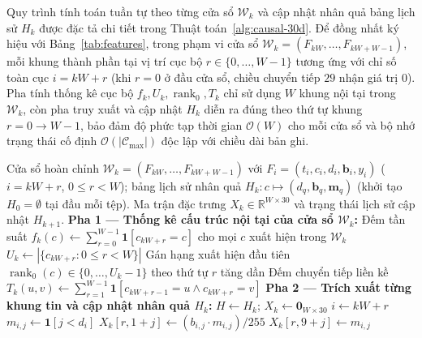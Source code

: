 \documentclass[12pt, a4paper, reqno, oneside]{book}
\begin{document}
Quy trình tính toán tuần tự theo từng cửa sổ $\mathcal{W}_k$ và cập nhật nhân quả bảng lịch sử $H_k$ được đặc tả chi tiết trong Thuật toán~\ref{alg:causal-30d}. Để đồng nhất ký hiệu với Bảng~\ref{tab:features}, trong phạm vi cửa sổ $\mathcal{W}_k=(F_{kW},\ldots,F_{kW+W-1})$, mỗi khung thành phần tại vị trí cục bộ $r \in \{0,\ldots,W-1\}$ tương ứng với chỉ số toàn cục $i = kW + r$ (khi $r=0$ ở đầu cửa sổ, chiều chuyển tiếp $29$ nhận giá trị $0$). Pha tính thống kê cục bộ $f_k, U_k, \operatorname{rank}_0, T_k$ chỉ sử dụng $W$ khung nội tại trong $\mathcal{W}_k$, còn pha truy xuất và cập nhật $H_k$ diễn ra đúng theo thứ tự khung $r=0 \to W-1$, bảo đảm độ phức tạp thời gian $\mathcal{O}(W)$ cho mỗi cửa sổ và bộ nhớ trạng thái cố định $\mathcal{O}(|\mathcal{C}_{\max}|)$ độc lập với chiều dài bản ghi.

\begin{algorithm}[htbp]
\caption{Trích xuất nhân quả biểu diễn cấu trúc 30 chiều cấp cửa sổ $\Phi(\mathcal{W}_k; H_k)$}\label{alg:causal-30d}
{\small\linespread{1.05}\selectfont
\begin{algorithmic}[1]
\Require Cửa sổ hoàn chỉnh $\mathcal{W}_k = (F_{kW}, \ldots, F_{kW+W-1})$ với $F_i = (t_i, c_i, d_i, \mathbf{b}_i, y_i)$ ($i = kW+r$, $0 \le r < W$); bảng lịch sử nhân quả $H_k : c \mapsto (d_q, \mathbf{b}_q, \mathbf{m}_q)$ (khởi tạo $H_0 = \emptyset$ tại đầu mỗi tệp).
\Ensure Ma trận đặc trưng $X_k \in \mathbb{R}^{W \times 30}$ và trạng thái lịch sử cập nhật $H_{k+1}$.
\State \textbf{Pha 1 --- Thống kê cấu trúc nội tại của cửa sổ $\mathcal{W}_k$:}
\State Đếm tần suất $f_k(c) \leftarrow \sum_{r=0}^{W-1} \mathbf{1}[c_{kW+r} = c]$ cho mọi $c$ xuất hiện trong $\mathcal{W}_k$
\State $U_k \leftarrow |\{c_{kW+r} : 0 \le r < W\}|$ 
\State Gán hạng xuất hiện đầu tiên $\operatorname{rank}_0(c) \in \{0, \ldots, U_k - 1\}$ theo thứ tự $r$ tăng dần
\State Đếm chuyển tiếp liền kề $T_k(u, v) \leftarrow \sum_{r=1}^{W-1} \mathbf{1}[c_{kW+r-1} = u \land c_{kW+r} = v]$
\State \textbf{Pha 2 --- Trích xuất từng khung tin và cập nhật nhân quả $H_k$:}
\State $H \leftarrow H_k$; \quad $X_k \leftarrow \mathbf{0}_{W \times 30}$
    \State $i \leftarrow kW + r$ 
        \State $m_{i,j} \leftarrow \mathbf{1}[j < d_i]$ 
        \State $X_k[r, 1 + j] \leftarrow (b_{i,j} \cdot m_{i,j}) / 255$ 
        \State $X_k[r, 9 + j] \leftarrow m_{i,j}$

\end{algorithmic}}
\end{algorithm}
\end{document}

